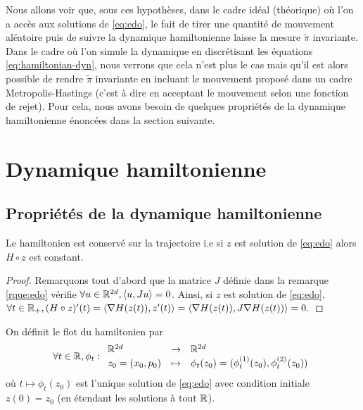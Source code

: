 \documentclass[10pt,a4paper]{article}
\begin{document}
Nous allons voir que, sous ces hypothèses, dans le cadre idéal (théorique) où l'on a accès aux solutions de \eqref{eq:edo}, le fait de tirer une quantité de mouvement aléatoire puis de suivre la dynamique hamiltonienne laisse la mesure $\tilde{\pi}$ invariante. Dans le cadre où l'on simule la dynamique en discrétisant les équations \eqref{eq:hamiltonian-dyn}, nous verrons que cela n'est plus le cas mais qu'il est alors possible de rendre $\tilde{\pi}$ invariante en incluant le mouvement proposé dans un cadre Metropolis-Hastings (c'est à dire en acceptant le mouvement selon une fonction de rejet). Pour cela, nous avons besoin de quelques propriétés de la dynamique hamiltonienne énoncées dans la section suivante.



\section{Dynamique hamiltonienne}

\subsection{Propriétés de la dynamique hamiltonienne}
\begin{Prop}\label{prop:conservation}
	Le hamiltonien est conservé sur la trajectoire i.e si $z$ est solution de \eqref{eq:edo} alors $H \circ z$ est constant.
\end{Prop}

\begin{proof}
	Remarquons tout d'abord que la matrice $J$ définie dans la remarque \ref{rque:edo} vérifie $\forall u \in \mathbb{R}^{2d}, { \left\langle u, Ju \right\rangle} = 0$. Ainsi, si $z$ est solution de \eqref{eq:edo},
	$
	\forall t \in \mathbb{R}_+, (H \circ z)'(t) = { \left\langle \nabla H (z(t)), z'(t) \right\rangle} = { \left\langle \nabla H (z(t)), J \nabla H(z(t)) \right\rangle} = 0.
	$
\end{proof}

\begin{Def}
	On définit le flot du hamiltonien par
	$$
	\forall t \in \mathbb{R}, \phi_t : { \begin{array}{lcl} 
		\mathbb{R}^{2d} & \to & \mathbb{R}^{2d} \\
		z_0 = (x_0, p_0) &\mapsto & \phi_t(z_0) = (\phi_t^{(1)}(z_0), \phi_t^{(2)}(z_0))
	 \end{array} }
	$$
	où $t \mapsto \phi_t(z_0)$ est l'unique solution de \eqref{eq:edo} avec condition initiale $z(0) = z_0$ (en étendant les solutions à tout $\mathbb{R}$).
\end{Def}
\end{document}
